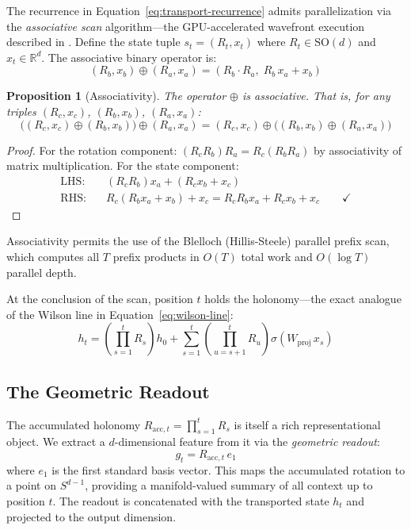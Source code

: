 \documentclass[11pt,a4paper]{article}
\newtheorem{proposition}[theorem]{Proposition}
\theoremstyle{definition}
\theoremstyle{remark}
\newcommand{\R}{\mathbb{R}}
\newcommand{\SO}{\mathrm{SO}}
\begin{document}
The recurrence in Equation~\eqref{eq:transport-recurrence} admits 
parallelization via the \emph{associative scan} algorithm---the 
GPU-accelerated wavefront execution described in 
\cite{davis2026wavefront}. Define 
the state tuple $s_t = (R_t, x_t)$ where $R_t \in \SO(d)$ and $x_t 
\in \R^d$. The associative binary operator is:
\begin{equation}
    (R_b, x_b) \oplus (R_a, x_a) = (R_b \cdot R_a, \; R_b \, x_a + x_b)
\label{eq:associative-operator}
\end{equation}

\begin{proposition}[Associativity]
The operator $\oplus$ is associative. That is, for any triples 
$(R_c, x_c)$, $(R_b, x_b)$, $(R_a, x_a)$:
\[
    \bigl((R_c, x_c) \oplus (R_b, x_b)\bigr) \oplus (R_a, x_a)
    = (R_c, x_c) \oplus \bigl((R_b, x_b) \oplus (R_a, x_a)\bigr)
\]
\end{proposition}
\begin{proof}
For the rotation component: $(R_c R_b) R_a = R_c (R_b R_a)$ by 
associativity of matrix multiplication. For the state component:
\begin{align*}
    \text{LHS:} \quad & (R_c R_b) x_a + (R_c x_b + x_c) \\
    \text{RHS:} \quad & R_c (R_b x_a + x_b) + x_c = R_c R_b x_a 
    + R_c x_b + x_c \qquad \checkmark
\end{align*}
\end{proof}

\noindent Associativity permits the use of the Blelloch (Hillis-Steele) 
parallel prefix scan, which computes all $T$ prefix products in $O(T)$ 
total work and $O(\log T)$ parallel depth.

At the conclusion of the scan, position $t$ holds the holonomy---the 
exact analogue of the Wilson line in Equation~\eqref{eq:wilson-line}:
\begin{equation}
    h_t = \left(\prod_{s=1}^{t} R_s\right) h_0 + \sum_{s=1}^{t} 
    \left(\prod_{u=s+1}^{t} R_u\right) \sigma(W_{\mathrm{proj}} \, x_s)
\label{eq:scan-result}
\end{equation}

\subsection{The Geometric Readout}
\label{subsec:geometric-readout}
\label{def:reading_head}

The accumulated holonomy $R_{\mathrm{acc},t} = \prod_{s=1}^{t} R_s$ 
is itself a rich representational object. We extract a $d$-dimensional 
feature from it via the \emph{geometric readout}:
\begin{equation}
    g_t = R_{\mathrm{acc},t} \, e_1
\label{eq:geometric-readout}
\end{equation}
where $e_1$ is the first standard basis vector. This maps the 
accumulated rotation to a point on $S^{d-1}$, providing a 
manifold-valued summary of all context up to position $t$. The 
readout is concatenated with the transported state $h_t$ and 
projected to the output dimension.
\end{document}
